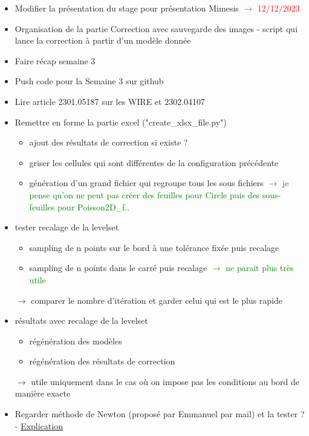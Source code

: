 \begin{itemize}[label=$\square$]
	\item[\later] Modifier la présentation du stage pour présentation Mimesis \textcolor{red}{$\rightarrow$ 12/12/2023}
	\item[\done] Organisation de la partie Correction avec sauvegarde des images - script qui lance la correction à partir d'un modèle donnée
	\item[\done] Faire récap semaine 3
	\item[\done] Push code pour la Semaine 3 sur github
	\item[\done] Lire article 2301.05187 sur les WIRE et 2302.04107
	\item[\done] Remettre en forme la partie excel ("create\_xlsx\_file.py")
	\begin{itemize}[label=\LARGE $\circ$]
		\item[\sdone] ajout des résultats de correction si existe ?
		\item[\sdone] griser les cellules qui sont différentes de la configuration précédente
		\item[\swontfix] génération d'un grand fichier qui regroupe tous les sous fichiers \textcolor{Green}{$\rightarrow$ je pense qu'on ne peut pas créer des feuilles pour Circle puis des sous-feuilles pour Poisson2D\_f..}		
	\end{itemize}
	\item[\done] tester recalage de la levelset
	\begin{itemize}[label=\LARGE $\circ$]
		\item[\sdone] sampling de n points sur le bord à une tolérance fixée puis recalage
		\item[\swontfix] sampling de n points dans le carré puis recalage \textcolor{green}{$\rightarrow$ ne parait plus très utile}
	\end{itemize}
	$\rightarrow$ comparer le nombre d'itération et garder celui qui est le plus rapide
	\item[\done] résultats avec recalage de la levelset
	\begin{itemize}[label=\LARGE $\circ$]
		\item[\sdone] régénération des modèles 
		\item[\sdone] régénération des résultats de correction
	\end{itemize}
	$\rightarrow$ utile uniquement dans le cas où on impose pas les conditions au bord de manière exacte
	\item[\wontfix] Regarder méthode de Newton (proposé par Emmanuel par mail) et la tester ? - \href{https://www.mathweb.fr/euclide/methode-de-newton/}{Explication}

\end{itemize}
